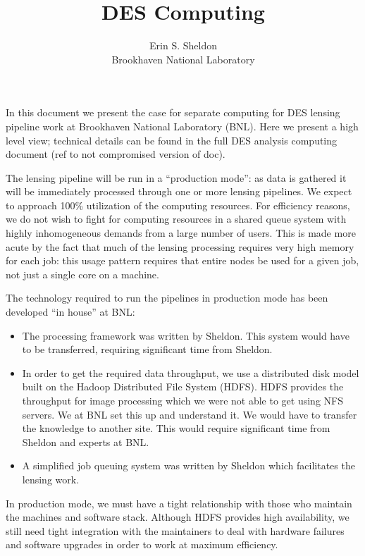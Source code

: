\documentclass[12pt]{article}
\title{DES Computing}
\author{Erin S. Sheldon\\
Brookhaven National Laboratory}
\date{}
\begin{document}
\maketitle


In this document we present the case for separate computing for DES lensing
pipeline work at Brookhaven National Laboratory (BNL).  Here we present a high
level view; technical details can be found in the full DES analysis computing
document (ref to not compromised version of doc).

The lensing pipeline will be run in a ``production mode'': as data is gathered
it will be immediately processed through one or more lensing pipelines.  We
expect to approach 100\% utilization of the computing resources.  For
efficiency reasons, we do not wish to fight for computing resources in a shared
queue system with highly inhomogeneous demands from a large number of users.
This is made more acute by the fact that much of the lensing processing
requires very high memory for each job: this usage pattern requires that entire
nodes be used for a given job, not just a single core on a machine.

The technology required to run the pipelines in production mode has been
developed ``in house'' at BNL:  
\begin{itemize}

    \item The processing framework was written by Sheldon. This system would
    have to be transferred, requiring significant time from Sheldon.

    \item In order to get the required data throughput, we use a distributed
    disk model built on the Hadoop Distributed File System (HDFS).  HDFS
    provides the throughput for image processing which we were not able to get
    using NFS servers.  We at BNL set this up and understand it. We would have
    to transfer the knowledge to another site.  This would require significant
    time from Sheldon and experts at BNL.
    
    \item A simplified job queuing system was written by Sheldon which
    facilitates the lensing work.

\end{itemize}

In production mode, we must have a tight relationship with those who maintain
the machines and software stack.  Although HDFS provides high availability, we
still need tight integration with the maintainers to deal with hardware
failures and software upgrades in order to work at maximum efficiency.  
\end{document}
